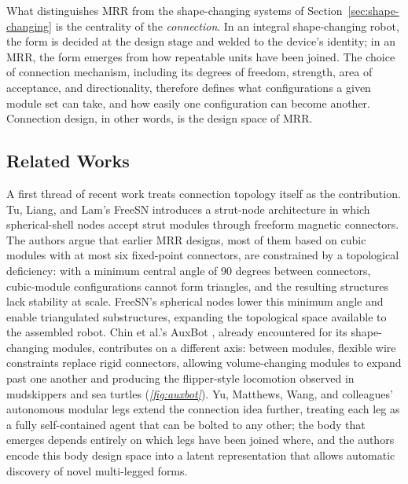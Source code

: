 What distinguishes MRR from the shape-changing systems of Section~\ref{sec:shape-changing} is the centrality of the \textit{connection}. In an integral shape-changing robot, the form is decided at the design stage and welded to the device's identity; in an MRR, the form emerges from how repeatable units have been joined. The choice of connection mechanism, including its degrees of freedom, strength, area of acceptance, and directionality, therefore defines what configurations a given module set can take, and how easily one configuration can become another. Connection design, in other words, is the design space of MRR.

\subsection{Related Works}
\label{subsec:mrr-related}

A first thread of recent work treats connection topology itself as the contribution. Tu, Liang, and Lam's FreeSN \cite{tuFreeSNFreeformStrutnode2022} introduces a strut-node architecture in which spherical-shell nodes accept strut modules through freeform magnetic connectors. The authors argue that earlier MRR designs, most of them based on cubic modules with at most six fixed-point connectors, are constrained by a topological deficiency: with a minimum central angle of 90 degrees between connectors, cubic-module configurations cannot form triangles, and the resulting structures lack stability at scale. FreeSN's spherical nodes lower this minimum angle and enable triangulated substructures, expanding the topological space available to the assembled robot. Chin et al.'s AuxBot \cite{chinFlipperStyleLocomotionStrong2023}, already encountered for its shape-changing modules, contributes on a different axis: between modules, flexible wire constraints replace rigid connectors, allowing volume-changing modules to expand past one another and producing the flipper-style locomotion observed in mudskippers and sea turtles (\textit{\cref{fig:auxbot}}). Yu, Matthews, Wang, and colleagues' autonomous modular legs \cite{AgileLeggedLocomotion} extend the connection idea further, treating each leg as a fully self-contained agent that can be bolted to any other; the body that emerges depends entirely on which legs have been joined where, and the authors encode this body design space into a latent representation that allows automatic discovery of novel multi-legged forms.

